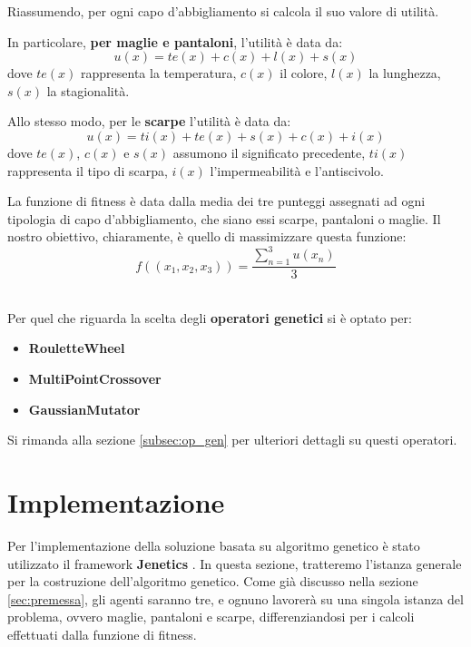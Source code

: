\documentclass[a4paper, 11pt, oneside]{report}
\begin{document}
            \newpage
            \par \noindent Riassumendo, per ogni capo d'abbigliamento si calcola il suo valore di utilità.
            \\
            \par \noindent In particolare, \textbf{per maglie e pantaloni}, l'utilità è data da:
            \[
                u(x)=te(x)+c(x)+l(x)+s(x)
            \]
            dove $te(x)$ rappresenta la temperatura, $c(x)$ il colore, $l(x)$ la lunghezza, $s(x)$ la stagionalità.
            \\
            \par \noindent Allo stesso modo, per le \textbf{scarpe} l'utilità è data da:
            \[
                u(x)=ti(x)+te(x)+s(x)+c(x)+i(x)
            \]
            dove $te(x)$, $c(x)$ e $s(x)$ assumono il significato precedente, $ti(x)$ rappresenta il tipo di scarpa,
            $i(x)$ l'impermeabilità e l'antiscivolo.
            \\
            \par \noindent La funzione di fitness è data dalla media dei tre punteggi assegnati
            ad ogni tipologia di capo d'abbigliamento, che siano essi scarpe, pantaloni o maglie. Il nostro obiettivo,
            chiaramente, è quello di massimizzare questa funzione:
            \[
                f((x_{1},x_{2},x_{3}))=\frac{\sum_{n=1}^{3} u(x_{n})}{3}
            \]
            \\
            \par \noindent Per quel che riguarda la scelta degli \textbf{operatori genetici} si è optato per:
            \begin{itemize}
                \item \textbf{RouletteWheel}
                \item \textbf{MultiPointCrossover}
                \item \textbf{GaussianMutator}
            \end{itemize}
            Si rimanda alla sezione \ref{subsec:op_gen} per ulteriori dettagli su questi operatori.

            \newpage
            \section{Implementazione}
            Per l'implementazione della soluzione basata su algoritmo genetico è stato utilizzato il framework
            \textbf{Jenetics} \cite{1}. In questa sezione, tratteremo l'istanza generale per la costruzione dell'algoritmo
            genetico. Come già discusso nella sezione \ref{sec:premessa}, gli agenti saranno tre, e ognuno lavorerà su una singola istanza
            del problema, ovvero maglie, pantaloni e scarpe, differenziandosi per i calcoli effettuati dalla funzione di
            fitness.
\end{document}
